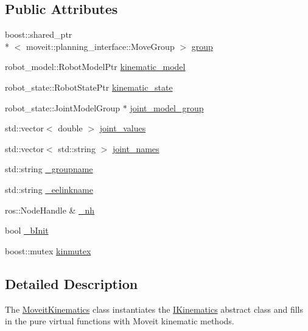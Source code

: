 \subsection*{Public Attributes}
\begin{DoxyCompactItemize}
\item 
boost\-::shared\-\_\-ptr\\*
$<$ moveit\-::planning\-\_\-interface\-::\-Move\-Group $>$ \hyperlink{classMoveitKinematics_a3581661c4c9d14201a64a8143f51da3e}{group}
\item 
robot\-\_\-model\-::\-Robot\-Model\-Ptr \hyperlink{classMoveitKinematics_a69d28b2a76e5f5d90cdee38e0a3d5965}{kinematic\-\_\-model}
\item 
robot\-\_\-state\-::\-Robot\-State\-Ptr \hyperlink{classMoveitKinematics_ad59ff2cb08c79d9337b6852da2d4aadf}{kinematic\-\_\-state}
\item 
robot\-\_\-state\-::\-Joint\-Model\-Group $\ast$ \hyperlink{classMoveitKinematics_aa988eb59ddeb9f734d9911a5f464f082}{joint\-\_\-model\-\_\-group}
\item 
std\-::vector$<$ double $>$ \hyperlink{classMoveitKinematics_a0ae2d3b65c1855ec6d6f094d1cd267f7}{joint\-\_\-values}
\item 
std\-::vector$<$ std\-::string $>$ \hyperlink{classMoveitKinematics_ab9ccffd768a0d30944f22db09fbb9f72}{joint\-\_\-names}
\item 
std\-::string \hyperlink{classMoveitKinematics_afb7a90e3cda4da3b515a6e4cc19babe2}{\-\_\-groupname}
\item 
std\-::string \hyperlink{classMoveitKinematics_a5a97c1d7f715983995df78a442901c9e}{\-\_\-eelinkname}
\item 
ros\-::\-Node\-Handle \& \hyperlink{classMoveitKinematics_acea7424509f44c5f77f379f356a547c8}{\-\_\-nh}
\item 
bool \hyperlink{classMoveitKinematics_aa03e65371bb97fce4c98cbb46e53f423}{\-\_\-b\-Init}
\item 
boost\-::mutex \hyperlink{classMoveitKinematics_a94dd916f6d9a7074ebd00356975d51ea}{kinmutex}
\end{DoxyCompactItemize}


\subsection{Detailed Description}
The \hyperlink{classMoveitKinematics}{Moveit\-Kinematics} class instantiates the \hyperlink{classIKinematics}{I\-Kinematics} abstract class and fills in the pure virtual functions with Moveit kinematic methods. 

